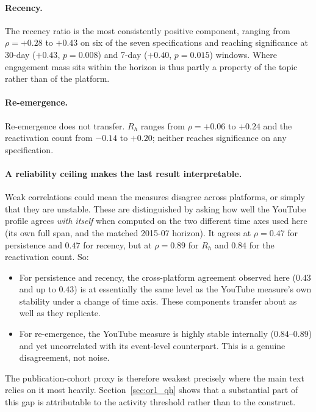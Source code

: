 \documentclass[11pt]{article}
\begin{document}
\paragraph{Recency.}
The recency ratio is the most consistently positive component, ranging from
$\rho = +0.28$ to $+0.43$ on six of the seven specifications and reaching
significance at 30-day ($+0.43$, $p = 0.008$) and 7-day ($+0.40$, $p = 0.015$)
windows. Where engagement mass sits within the horizon is thus partly a property
of the topic rather than of the platform.

\paragraph{Re-emergence.}
Re-emergence does not transfer. $R_h$ ranges from $\rho = +0.06$ to $+0.24$ and
the reactivation count from $-0.14$ to $+0.20$; neither reaches significance on
any specification.

\paragraph{A reliability ceiling makes the last result interpretable.}
Weak correlations could mean the measures disagree across platforms, or simply
that they are unstable. These are distinguished by asking how well the YouTube
profile agrees \emph{with itself} when computed on the two different time axes
used here (its own full span, and the matched 2015-07 horizon). It agrees at
$\rho = 0.47$ for persistence and $0.47$ for recency, but at $\rho = 0.89$ for
$R_h$ and $0.84$ for the reactivation count. So:

\begin{itemize}
\item For persistence and recency, the cross-platform agreement observed here
      ($0.43$ and up to $0.43$) is at essentially the same level as the YouTube
      measure's own stability under a change of time axis. These components
      transfer about as well as they replicate.
\item For re-emergence, the YouTube measure is highly stable internally
      ($0.84$--$0.89$) and yet uncorrelated with its event-level counterpart.
      This is a genuine disagreement, not noise.
\end{itemize}

The publication-cohort proxy is therefore weakest precisely where the main text
relies on it most heavily. Section~\ref{sec:or1_qh} shows that a substantial part
of this gap is attributable to the activity threshold rather than to the
construct.
\end{document}
